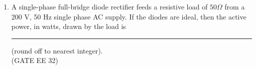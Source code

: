 \begin{enumerate}[label=\thechapter.\arabic*,ref=\thechapter.\theenumi]

\item A single-phase full-bridge diode rectifier feeds a resistive load of $50 \Omega$ from a 200 V,
50 Hz single phase AC supply. If the diodes are ideal, then the active power, in watts,
drawn by the load is \rule{1cm}{0.5mm} (round off to nearest integer).  \\
\hfill (GATE EE 32)\\
\solution

\pagebreak
\end{enumerate}
